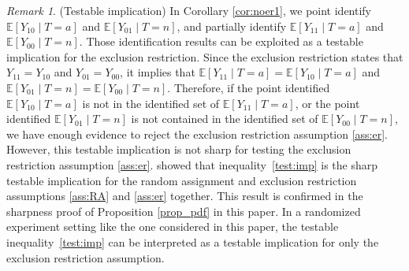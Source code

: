 \documentclass[12pt]{article}
\theoremstyle{plain}
\theoremstyle{definition}
\theoremstyle{remark}
\newtheorem{remark}{Remark}%
\begin{document}
\begin{remark}(Testable implication)
    In Corollary \ref{cor:noer1}, we point identify $\mathbb{E}[Y_{10} \mid T = a]$ and $\mathbb{E}[Y_{01} \mid T = n]$, and partially identify $\mathbb{E}[Y_{11} \mid T = a]$ and $\mathbb{E}[Y_{00} \mid T = n]$. Those identification results can be exploited as a testable implication for the exclusion restriction. Since the exclusion restriction states that $Y_{11} = Y_{10}$ and $Y_{01} = Y_{00}$, it implies that $\mathbb{E}[Y_{11} \mid T = a] = \mathbb{E}[Y_{10} \mid T = a]$ and $\mathbb{E}[Y_{01} \mid T = n] = \mathbb{E}[Y_{00} \mid T = n]$. Therefore, if the point identified $\mathbb{E}[Y_{10} \mid T = a]$ is not in the identified set of $\mathbb{E}[Y_{11} \mid T = a]$, or the point identified $\mathbb{E}[Y_{01} \mid T = n]$ is not contained in the identified set of $\mathbb{E}[Y_{00} \mid T = n]$, we have enough evidence to reject the exclusion restriction assumption \ref{ass:er}. However, this testable implication is not sharp for testing the exclusion restriction assumption \ref{ass:er}. \citet[Proposition 3.2 (ii)]{Kitagawa2021TheIndependence} showed that inequality~\eqref{test:imp} is the sharp testable implication for the random assignment and exclusion restriction assumptions \ref{ass:RA} and \ref{ass:er} together. This result is confirmed in the sharpness proof of Proposition \ref{prop_pdf} in this paper. In a randomized experiment setting like the one considered in this paper, the testable inequality~\eqref{test:imp} can be interpreted as a testable implication for only the exclusion restriction assumption. 
\end{remark}
\end{document}
